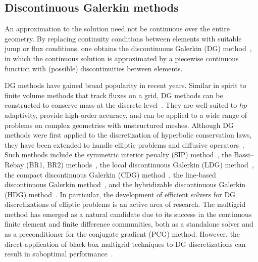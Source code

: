 \subsection{Discontinuous Galerkin methods}

An approximation to the solution need not be continuous over the entire geometry. By replacing continuity conditions between elements with suitable jump or flux conditions, one obtains the discontinuous Galerkin (DG) method~\cite{Reed_73_01}, in which the continuous solution is approximated by a piecewise continuous function with (possible) discontinuities between elements.

DG methods have gained broad popularity in recent years. Similar in spirit to finite volume methods that track fluxes on a grid, DG methods can be constructed to conserve mass at the discrete level~\cite{Hesthaven_08_01}. They are well-suited to $hp$-adaptivity, provide high-order accuracy, and can be applied to a wide range of problems on complex geometries with unstructured meshes. Although DG methods were first applied to the discretization of hyperbolic conservation laws, they have been extended to handle elliptic problems and diffusive operators~\cite{Arnold_02_01}. Such methods include the symmetric interior penalty (SIP) method~\cite{Douglas_76_01, Arnold_82_01}, the Bassi--Rebay (BR1, BR2) methods~\cite{Bassi_97_01, Bassi_97_02}, the local discontinuous Galerkin (LDG) method~\cite{Cockburn_98_01}, the compact discontinuous Galerkin (CDG) method~\cite{Peraire_08_01}, the line-based discontinuous Galerkin method~\cite{Persson_13_01}, and the hybridizable discontinuous Galerkin (HDG) method~\cite{Cockburn_09_01}. In particular, the development of efficient solvers for DG discretizations of elliptic problems is an active area of research. The multigrid method has emerged as a natural candidate due to its success in the continuous finite element and finite difference communities, both as a standalone solver and as a preconditioner for the conjugate gradient (PCG) method. However, the direct application of black-box multigrid techniques to DG discretizations can result in suboptimal performance~\cite{Antonietti_15_01, Gopalakrishnan_03_01}.

